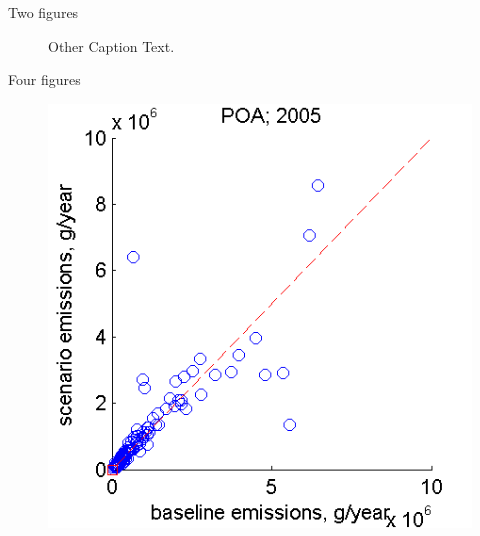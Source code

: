 \documentclass{beamer}	%
\begin{document}
\begin{frame}{Two figures}
\begin{figure}[ht]
\begin{minipage}[b]{0.45\linewidth}
		\caption{Other Caption Text.}
		\label{fig:figure2}
	\end{minipage}
\end{figure}

\end{frame}

\begin{frame}{Four figures}

\begin{figure}[ht]
	\begin{minipage}[t]{0.3\linewidth} 
		\centering
		\includegraphics[width=\textwidth]{images/filename1}
	\end{minipage}
	\hspace{1cm}
	\begin{minipage}[t]{0.3\linewidth}
		\centering

\end{minipage}
\end{figure}
\end{frame}
\end{document}
